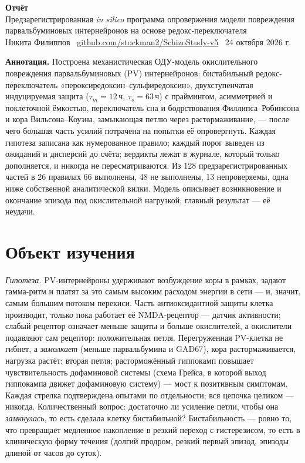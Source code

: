 \documentclass[11pt,a4paper]{article}
\theoremstyle{remark}
\begin{document}
\begin{center}
{\large\bfseries Отчёт}\\[2pt]
{\small Предзарегистрированная \emph{in silico} программа опровержения
модели повреждения парвальбуминовых интернейронов на основе редокс-переключателя}\\[2pt]
{\small Никита Филиппов \textperiodcentered\
\href{https://github.com/stockman2/SchizoStudy-v5}{github.com/stockman2/SchizoStudy-v5}
\textperiodcentered\ 24 октября 2026 г.}
\end{center}
\vspace{-4pt}

\noindent\textbf{Аннотация.} Построена механистическая ОДУ-модель окислительного
повреждения парвальбуминовых (PV) интернейронов: бистабильный редокс-переключатель
«пероксиредоксин--сульфиредоксин», двухступенчатая индуцируемая защита
($\tau_m=12$\,ч, $\tau_s=63$\,ч) с праймингом, асимметрией и поклеточной ёмкостью,
переключатель сна и бодрствования Филлипса--Робинсона и кора Вильсона--Коуэна,
замыкающая петлю через растормаживание, --- после чего большая часть усилий потрачена
на попытки её опровергнуть. Каждая гипотеза записана как нумерованное правило; каждый
порог выведен из ожиданий и дисперсий до счёта; вердикты лежат в журнале, который
только дополняется, и
никогда не пересматриваются. Из 128 предзарегистрированных частей в 26 правилах 66
выполнены, 48 не выполнены, 13 непроверяемы, одна ниже собственной аналитической
вилки. Модель описывает возникновение и окончание эпизода под окислительной
нагрузкой; главный результат --- её неудачи.

\section{Объект изучения}\label{sec:intro}
\emph{Гипотеза.} PV-интернейроны удерживают возбуждение коры в рамках, задают
гамма-ритм и платят за это самым высоким расходом энергии в сети --- и, значит, самым
большим потоком перекиси. Часть антиоксидантной защиты клетка производит, только пока
работает её NMDA-рецептор --- датчик активности; слабый рецептор означает меньше защиты
и больше окислителей, а окислители подавляют сам рецептор: положительная петля.
Перегруженная PV-клетка не гибнет, а \emph{замолкает} (меньше парвальбумина и GAD67),
кора растормаживается, нагрузка растёт: вторая петля; расторможённый гиппокамп повышает
чувствительность дофаминовой системы (схема Грейса, в которой выход гиппокампа
движет дофаминовую систему) --- мост к позитивным симптомам.
Каждая стрелка подтверждена опытами по отдельности; вся цепочка целиком --- никогда.
Количественный вопрос: достаточно ли усиление петли, чтобы она \emph{замкнулась}, то
есть сделала клетку бистабильной? Бистабильность --- ровно то, что превращает медленное
накопление в резкий переход с гистерезисом, то есть в клиническую форму течения
(долгий продром, резкий первый эпизод, эпизоды длиной от часов до суток).
\end{document}
